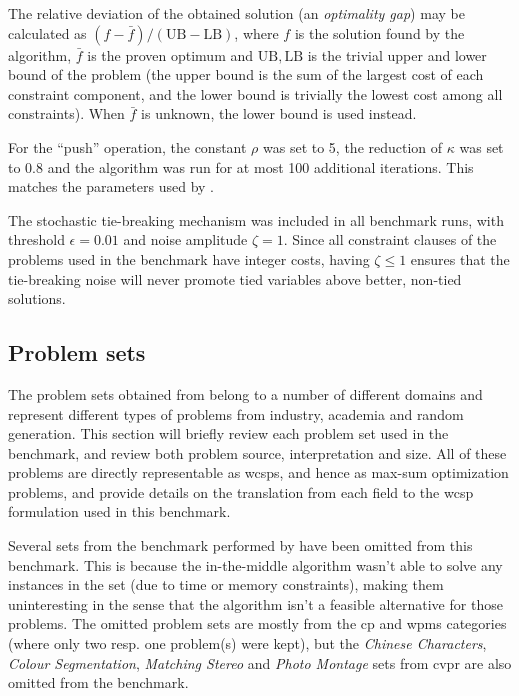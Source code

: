 \label{pg:bench-method}
The relative deviation of the obtained solution (an \emph{optimality gap}) may be calculated as \((f - \bar{f})/(\mathrm{UB}-\mathrm{LB})\), where \(f\) is the solution found by the algorithm, \(\bar{f}\) is the proven optimum and \(\mathrm{UB}, \mathrm{LB}\) is the trivial upper and lower bound of the problem (the upper bound is the sum of the largest cost of each constraint component, and the lower bound is trivially the lowest cost among all constraints).
When \(\bar{f}\) is unknown, the lower bound is used instead.

For the \enquote{push} operation, the constant \(\rho\) was set to \num{5}, the reduction of \(\kappa\) was set to \num{0.8} and the algorithm was run for at most \num{100} additional iterations.
This matches the parameters used by \textcite{Bastert10}.

The stochastic tie-breaking mechanism was included in all benchmark runs, with threshold \(\epsilon=\num{0.01}\) and noise amplitude \(\zeta=1\).
Since all constraint clauses of the problems used in the benchmark have integer costs, having \(\zeta\leq1\) ensures that the tie-breaking noise will never promote tied variables above better, non-tied solutions.

\subsection{Problem sets}
The problem sets obtained from \textcite{deGivry14} belong to a number of different domains and represent different types of problems from industry, academia and random generation.
This section will briefly review each problem set used in the benchmark, and review both problem source, interpretation and size.
All of these problems are directly representable as \glspl{wcsp}, and hence as max-sum optimization problems, and \textcite{deGivry14} provide details on the translation from each field to the \gls{wcsp} formulation used in this benchmark.

Several sets from the benchmark performed by \textcite{deGivry14} have been omitted from this benchmark.
This is because the in-the-middle algorithm wasn't able to solve any instances in the set (due to time or memory constraints), making them uninteresting in the sense that the algorithm isn't a feasible alternative for those problems.
The omitted problem sets are mostly from the \gls{cp} and \gls{wpms} categories (where only two resp. one problem(s) were kept), but the \emph{Chinese Characters}, \emph{Colour Segmentation}, \emph{Matching Stereo} and \emph{Photo Montage} sets from \gls{cvpr} are also omitted from the benchmark.

